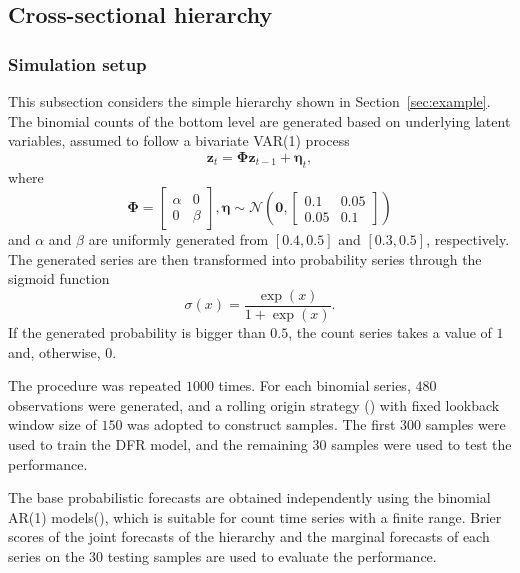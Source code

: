 \documentclass[a4paper,review,12pt,authoryear]{elsarticle}
\begin{document}
     \subsection{Cross-sectional hierarchy}
     \label{sec:cross-sectional_simu}
     \subsubsection{Simulation setup}
     This subsection considers the simple hierarchy shown in Section~\ref{sec:example}.
     The binomial counts of the bottom level are generated based on underlying latent variables, assumed to follow a bivariate VAR(1) process
     \[\mathbf{z}_t = \mathbf{\Phi}\mathbf{z}_{t-1}+\boldsymbol{\eta}_t,\]
     where
     \[
       \mathbf{\Phi} = \left[\begin{matrix}
         \alpha & 0 \\
         0 & \beta
       \end{matrix}\right], \boldsymbol{\eta} \sim \mathcal{N}\left(\mathbf{0}, \left[\begin{matrix}
         0.1 & 0.05 \\
         0.05 & 0.1 
       \end{matrix}\right]\right)
     \]
     and $\alpha$ and $\beta$ are uniformly generated from $[0.4, 0.5]$ and $[0.3,0.5]$, respectively. 
     The generated series are then transformed into probability series through the sigmoid function 
     \[
     \sigma(x) = \frac{\exp(x)}{1+\exp(x)}.
     \]
     If the generated probability is bigger than $0.5$, the count series takes a value of $1$ and, otherwise, $0$.
     
     The procedure was repeated $1000$ times. 
     For each binomial series, $480$ observations were generated,
     and a rolling origin strategy () with fixed lookback window size of $150$ was adopted to construct samples. 
     The first $300$ samples were used to train the DFR model, and the remaining $30$ samples were used to test the performance.
     
     The base probabilistic forecasts are obtained independently using the binomial AR(1) models(\citealp{weissParameterEstimationBinomial2013}), which is suitable for count time series with a finite range.
     Brier scores of the joint forecasts of the hierarchy and the marginal forecasts of each series on the $30$ testing samples are used to evaluate the performance. 
     
\end{document}
